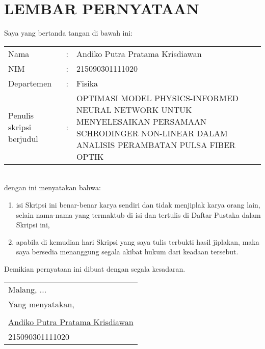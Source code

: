 \chapter*{LEMBAR PERNYATAAN}
\vspace{1cm}
Saya yang bertanda tangan di bawah ini:
\medskip \\ 
 	\begin{tabular}{llp{6cm}}
 		Nama & : & Andiko Putra Pratama Krisdiawan \\
 		NIM & : & 215090301111020 \\
 		Departemen & : & Fisika \\
 		Penulis skripsi berjudul & : & OPTIMASI MODEL PHYSICS-INFORMED NEURAL
NETWORK UNTUK MENYELESAIKAN PERSAMAAN
SCHRODINGER NON-LINEAR DALAM ANALISIS
PERAMBATAN PULSA FIBER OPTIK		
 	\end{tabular}
 	\\
dengan ini menyatakan bahwa:
\begin{enumerate}
	\item isi Skripsi ini benar-benar karya sendiri dan tidak menjiplak karya orang lain, selain nama-nama yang termaktub di isi dan tertulis di Daftar Pustaka dalam Skripsi ini,
	\item apabila di kemudian hari Skripsi yang saya tulis terbukti hasil jiplakan, maka saya bersedia menanggung segala akibat hukum dari keadaan tersebut.
\end{enumerate}
Demikian pernyataan ini dibuat dengan segala kesadaran.\\

\begin{flushright}
    \begin{tabular}{l}
        Malang, ...\\
	    Yang menyatakan,\\
	    \vspace{1cm}\\
	    \underline{Andiko Putra Pratama Krisdiawan}\\
	    215090301111020
    \end{tabular}
	
\end{flushright}
\cleardoublepage

